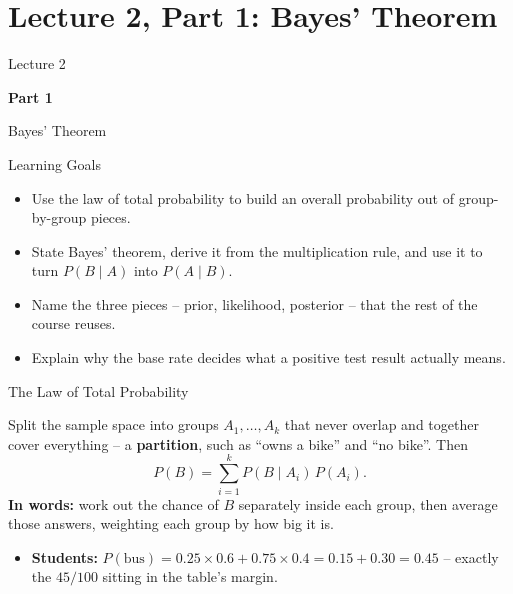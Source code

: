 \section{Lecture 2, Part 1: Bayes' Theorem}

\begin{frame}
\vfill
\centering
{\color{RLBlue}\large Lecture 2}

\vspace{0.3em}
{\color{RLBlue}\Large\bfseries Part 1}

\vspace{0.6em}
{\Large Bayes' Theorem}
\vfill
\end{frame}

\begin{frame}{Learning Goals}
\begin{itemize}
  \item Use the law of total probability to build an overall probability out of group-by-group pieces.
  \pause
  \item State Bayes' theorem, derive it from the multiplication rule, and use it to turn $P(B \mid A)$ into $P(A \mid B)$.
  \pause
  \item Name the three pieces -- prior, likelihood, posterior -- that the rest of the course reuses.
  \pause
  \item Explain why the base rate decides what a positive test result actually means.
\end{itemize}
\end{frame}

\begin{frame}{The Law of Total Probability}
\begin{rldefinition}
Split the sample space into groups $A_1, \dots, A_k$ that never overlap and together cover everything -- a \textbf{partition}, such as ``owns a bike'' and ``no bike''. Then
\[
P(B) = \sum_{i=1}^{k} P(B \mid A_i)\,P(A_i).
\]
\smallskip
\textbf{In words:} work out the chance of $B$ separately inside each group, then average those answers, weighting each group by how big it is.
\end{rldefinition}
\pause
\begin{itemize}
  \item \textbf{Students:} $P(\text{bus}) = 0.25 \times 0.6 + 0.75 \times 0.4 = 0.15 + 0.30 = 0.45$ -- exactly the $45/100$ sitting in the table's margin.
\end{itemize}
\end{frame}

